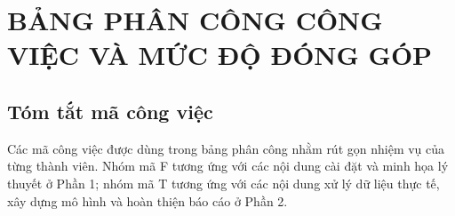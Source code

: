 ﻿%
\section*{BẢNG PHÂN CÔNG CÔNG VIỆC VÀ MỨC ĐỘ ĐÓNG GÓP}

\subsection*{Tóm tắt mã công việc}

Các mã công việc được dùng trong bảng phân công nhằm rút gọn nhiệm vụ của từng thành viên.
Nhóm mã F tương ứng với các nội dung cài đặt và minh họa lý thuyết ở Phần 1; nhóm mã T tương
ứng với các nội dung xử lý dữ liệu thực tế, xây dựng mô hình và hoàn thiện báo cáo ở Phần 2.

